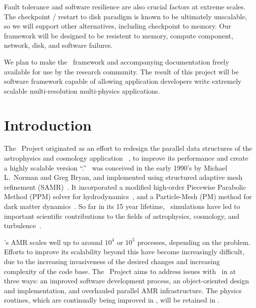 \documentclass[10pt,twocolumn]{article}
\begin{document}
 Fault tolerance and software
resilience are also crucial factors at extreme scales.  The checkpoint
/ restart to disk paradigm is known to be ultimately unscalable, so we
will support other alternatives, including checkpoint to memory.  Our
framework will be designed to be resistent to memory, compute
component, network, disk, and software failures.

%
We plan to make the \cello\ framework and accompanying documentation
freely available for use by the research community.  The result of
this project will be software framework capable of allowing
application developers write extremely scalable multi-resolution
multi-physics applications.

\section{Introduction} \label{s:intro}


The \cello\ Project originated as an effort to redesign the parallel
data structures of the astrophysics and cosmology application
\enzo~\cite{OsBr04}, to improve its performance and create a highly
scalable version ``\enzoii.''  \enzo\ was conceived in the early
1990's by Michael L.~Norman and Greg Bryan, and implemented using
structured adaptive mesh refinement (SAMR)~\cite{BeCo89}.  It
incorporated a modified high-order Piecewise Parabolic Method (PPM)
solver for hydrodynamics~\cite{WoCo84b}, and a Particle-Mesh (PM)
method for dark matter dynamics~\cite{@@@PM}.  So far in its 15 year
lifetime, \enzo\ simulations have led to important scientific
contributions to the fields of astrophysics, cosmology, and
turbulence~\cite{@@@enzo-science}.

\enzo's AMR scales well up to around $10^4$ or $10^5$ processes,
depending on the problem.  Efforts to improve its scalability beyond
this have become increasingly difficult, due to the increasing
invasiveness of the desired changes and increasing complexity of the
code base.  The \cello\ Project aims to address issues with \enzo\ in
at three ways: an improved software development process, an
object-oriented design and implementation, and overhauled parallel AMR
infrastructure.  The physics routines, which are continually being
improved in \enzo, will be retained in \enzoii.
\end{document}
